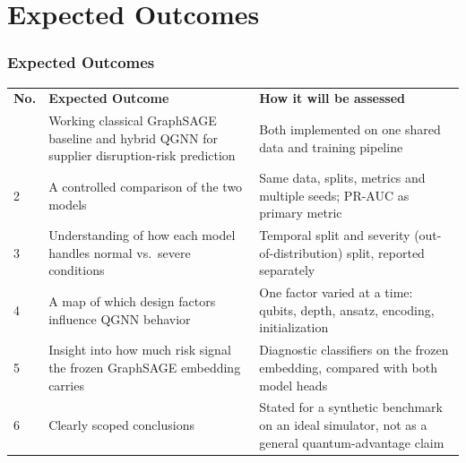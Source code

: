 \documentclass{beamer}
\newcommand{\tabfont}{\scriptsize}
\newcommand{\rowgap}{\addlinespace[4pt]}
\begin{document}
\section[Outcomes]{Expected Outcomes}
\begin{frame}[t,shrink=6]
\frametitle{Expected Outcomes}
\tabfont
\centering
\begin{tabularx}{\linewidth}{@{}>{\raggedright\arraybackslash}p{0.6cm}
                               >{\raggedright\arraybackslash}p{4.0cm}
                               >{\raggedright\arraybackslash}X@{}}
\multicolumn{3}{@{}c@{}}{\textbf{Table 5: Expected Outcomes}} \\
\toprule
\textbf{No.} & \textbf{Expected Outcome} & \textbf{How it will be assessed} \\
\midrule
1 & Working classical GraphSAGE baseline and hybrid QGNN for supplier
    disruption-risk prediction &
Both implemented on one shared data and training pipeline \\ \rowgap

2 & A controlled comparison of the two models &
Same data, splits, metrics and multiple seeds; PR-AUC as primary metric \\ \rowgap

3 & Understanding of how each model handles normal vs.\ severe conditions &
Temporal split and severity (out-of-distribution) split, reported separately \\ \rowgap

4 & A map of which design factors influence QGNN behavior &
One factor varied at a time: qubits, depth, ansatz, encoding, initialization \\ \rowgap

5 & Insight into how much risk signal the frozen GraphSAGE embedding carries &
Diagnostic classifiers on the frozen embedding, compared with both model heads \\ \rowgap

6 & Clearly scoped conclusions &
Stated for a synthetic benchmark on an ideal simulator, not as a general
quantum-advantage claim \\
\bottomrule
\end{tabularx}
\end{frame}
\end{document}

